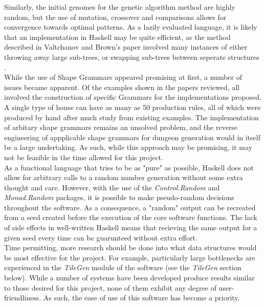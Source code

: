 \documentclass{article}
\begin{document}
Similarly, the initial genomes for the genetic algorithm method are highly random, but the use of mutation, crossover and comparisons allows for convergence towards optimal patterns. As a lazily evaluated language, it is likely that an implementation in Haskell may be quite efficient, as the method described in Valtchanov and Brown's paper involved many instances of either throwing away large sub-trees, or swapping sub-trees between seperate structures \cite{genetic}.\\



While the use of Shape Grammars appeared promising at first, a number of issues became apparent. Of the examples shown in the papers reviewed, all involved the construction of specific Grammars for the implementations proposed. A single type of house can have as many as 50 production rules, all of which were produced by hand after much study from existing examples. The implementation of arbitary shape grammars remains an unsolved problem, and the reverse engineering of appplicable shape grammars for dungeon generation would in itself be a large undertaking. As such, while this approach may be promising, it may not be feasible in the time allowed for this project.\\



As a functional language that tries to be as "pure" as possible, Haskell does not allow for arbitrary calls to a random number generation without some extra thought and care. However, with the use of the \textit{Control.Random} and \textit{Monad.Random} packages, it is possible to make pseudo-random decisions throughout the software. As a consequence, a "random" output can be recreated from a seed created before the execution of the core software functions. The lack of side effects in well-written Haskell means that recieving the same output for a given seed every time can be guarunteed without extra effort.\\



Time permitting, more research should be done into what data structures would be most effective for the project. For example, particularly large bottlenecks are experienced in the \textit{TileGen} module of the software (see the \textit{TileGen} section below). While a number of systems have been developed produce results similar to those desired for this project, none of them exhibit any degree of user-friendliness. As such, the ease of use of this software has become a priority.
\end{document}
